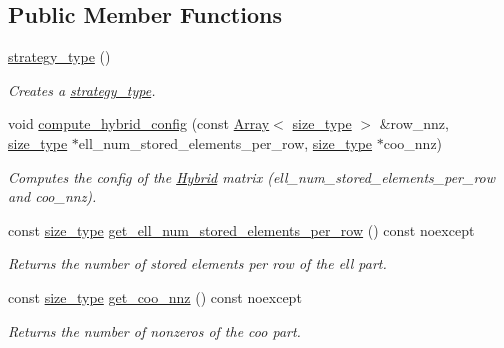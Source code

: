 \subsection*{Public Member Functions}
\begin{DoxyCompactItemize}
\item 
\mbox{\label{classgko_1_1matrix_1_1Hybrid_1_1strategy__type_a307425e7a1b925583cec9d6dd30be301}} 
\hyperlink{classgko_1_1matrix_1_1Hybrid_1_1strategy__type_a307425e7a1b925583cec9d6dd30be301}{strategy\+\_\+type} ()
\begin{DoxyCompactList}\small\item\em Creates a \hyperlink{classgko_1_1matrix_1_1Hybrid_1_1strategy__type}{strategy\+\_\+type}. \end{DoxyCompactList}\item 
void \hyperlink{classgko_1_1matrix_1_1Hybrid_1_1strategy__type_af784a54f979bcdf55e1e76b64850dd68}{compute\+\_\+hybrid\+\_\+config} (const \hyperlink{classgko_1_1Array}{Array}$<$ \hyperlink{namespacegko_a6e5c95df0ae4e47aab2f604a22d98ee7}{size\+\_\+type} $>$ \&row\+\_\+nnz, \hyperlink{namespacegko_a6e5c95df0ae4e47aab2f604a22d98ee7}{size\+\_\+type} $\ast$ell\+\_\+num\+\_\+stored\+\_\+elements\+\_\+per\+\_\+row, \hyperlink{namespacegko_a6e5c95df0ae4e47aab2f604a22d98ee7}{size\+\_\+type} $\ast$coo\+\_\+nnz)
\begin{DoxyCompactList}\small\item\em Computes the config of the \hyperlink{classgko_1_1matrix_1_1Hybrid}{Hybrid} matrix (ell\+\_\+num\+\_\+stored\+\_\+elements\+\_\+per\+\_\+row and coo\+\_\+nnz). \end{DoxyCompactList}\item 
const \hyperlink{namespacegko_a6e5c95df0ae4e47aab2f604a22d98ee7}{size\+\_\+type} \hyperlink{classgko_1_1matrix_1_1Hybrid_1_1strategy__type_a3a1bc0e4837a3fde7650455088c3da8a}{get\+\_\+ell\+\_\+num\+\_\+stored\+\_\+elements\+\_\+per\+\_\+row} () const noexcept
\begin{DoxyCompactList}\small\item\em Returns the number of stored elements per row of the ell part. \end{DoxyCompactList}\item 
const \hyperlink{namespacegko_a6e5c95df0ae4e47aab2f604a22d98ee7}{size\+\_\+type} \hyperlink{classgko_1_1matrix_1_1Hybrid_1_1strategy__type_a4eab8283af5bbec83dab7c7f24df32ab}{get\+\_\+coo\+\_\+nnz} () const noexcept
\begin{DoxyCompactList}\small\item\em Returns the number of nonzeros of the coo part. \end{DoxyCompactList}\item 

\end{DoxyCompactItemize}

